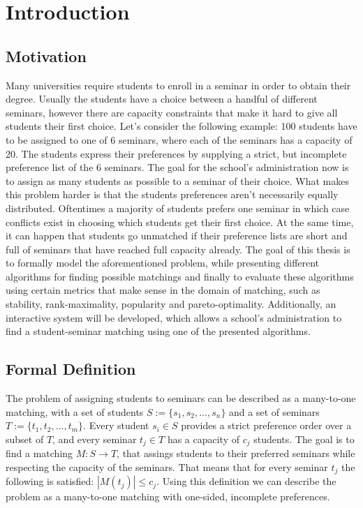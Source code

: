 \section{Introduction}
\label{sec:introduction}

\subsection{Motivation}
Many universities require students to enroll in a seminar in order to obtain their degree. Usually the students have a choice between a handful of different seminars, however there are capacity constraints that make it hard to give all students their first choice. Let's consider the following example: 100 students have to be assigned to one of 6 seminars, where each of the seminars has a capacity of 20. The students express their preferences by supplying a strict, but incomplete preference list of the 6 seminars. The goal for the school's administration now is to assign as many students as possible to a seminar of their choice. 
\newline
What makes this problem harder is that the students preferences aren't necessarily equally distributed. Oftentimes a majority of students prefers one seminar in which case conflicts exist in choosing which students get their first choice. At the same time, it can happen that students go unmatched if their preference lists are short and full of seminars that have reached full capacity already.
\newline
The goal of this thesis is to formally model the aforementioned problem, while presenting different algorithms for finding possible matchings and finally to evaluate these algorithms using certain metrics that make sense in the domain of matching, such as stability, rank-maximality, popularity and pareto-optimality. Additionally, an interactive system will be developed, which allows a school's administration to find a student-seminar matching using one of the presented algorithms. 

\subsection{Formal Definition}
The problem of assigning students to seminars can be described as a many-to-one matching, with a set of students $S:= \{s_1, s_2, ...,s_n\}$ and a set of seminars $T:= \{t_1, t_2, ..., t_m\}$. Every student $s_i \in S$ provides a strict preference order over a subset of $T$, and every seminar $t_j \in T$ has a capacity of $c_j$ students. The goal is to find a matching $M: S \rightarrow T$, that assings students to their preferred seminars while respecting the capacity of the seminars. That means that for every seminar $t_j$ the following is satisfied: $|M(t_j)| \leq c_j$. Using this definition we can describe the problem as a many-to-one matching with one-sided, incomplete preferences.  

